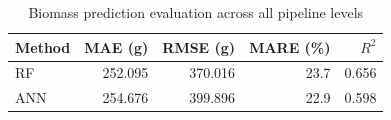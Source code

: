 \begin{table}[ht]
  \centering
  \caption{Biomass prediction evaluation across all pipeline levels}
  \label{tab:comparison}
  \begin{tabular}{lrrrr}
    \toprule
    Method & MAE (g) & RMSE (g) & MARE (\%) & $R^2$ \\
    \midrule
    RF & 252.095 & 370.016 & 23.7 & 0.656 \\
    ANN & 254.676 & 399.896 & 22.9 & 0.598 \\
    \bottomrule
  \end{tabular}
\end{table}